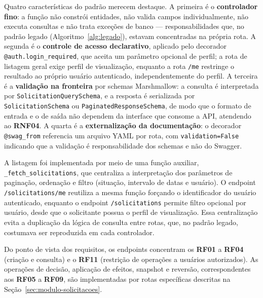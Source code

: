 Quatro características do padrão merecem destaque. A primeira é o 
\textbf{controlador fino}: a função não constrói entidades, não valida 
campos individualmente, não executa consultas e não trata exceções de 
banco — responsabilidades que, no padrão legado (Algoritmo~\ref{alg:legado}), 
estavam concentradas na própria rota. A segunda é o \textbf{controle 
de acesso declarativo}, aplicado pelo decorador 
\texttt{@auth.login\_required}, que aceita um parâmetro opcional de 
perfil; a rota de listagem geral exige perfil de visualização, enquanto 
a rota \texttt{/me} restringe o resultado ao próprio usuário autenticado, 
independentemente do perfil. A terceira é a \textbf{validação na fronteira} 
por schemas Marshmallow: a consulta é interpretada por 
\texttt{SolicitationQuerySchema}, e a resposta é serializada por 
\texttt{SolicitationSchema} ou \texttt{PaginatedResponseSchema}, de modo 
que o formato de entrada e o de saída não dependem da interface que 
consome a API, atendendo ao \textbf{RNF04}. A quarta é a \textbf{externalização
da documentação}: o decorador \texttt{@swag\_from} referencia um arquivo 
YAML por rota, com \texttt{validation=False} indicando que a validação 
é responsabilidade dos schemas e não do Swagger.

A listagem foi implementada por meio de uma função auxiliar, 
\texttt{\_fetch\_solicitations}, que centraliza a interpretação dos 
parâmetros de paginação, ordenação e filtro (situação, intervalo de 
datas e usuário). O endpoint \texttt{/solicitations/me} reutiliza a 
mesma função forçando o identificador do usuário autenticado, enquanto 
o endpoint \texttt{/solicitations} permite filtro opcional por usuário, 
desde que o solicitante possua o perfil de visualização. Essa 
centralização evita a duplicação da lógica de consulta entre rotas, 
que, no padrão legado, costumava ser reproduzida em cada controlador.

Do ponto de vista dos requisitos, os endpoints concentram os \textbf{RF01} a \textbf{RF04} 
(criação e consulta) e o \textbf{RF11} (restrição de operações a usuários 
autorizados). As operações de decisão, aplicação de efeitos, snapshot e 
reversão, correspondentes aos \textbf{RF05} a \textbf{RF09}, são implementadas por rotas 
específicas descritas na Seção~\ref{sec:modulo-solicitacoes}.